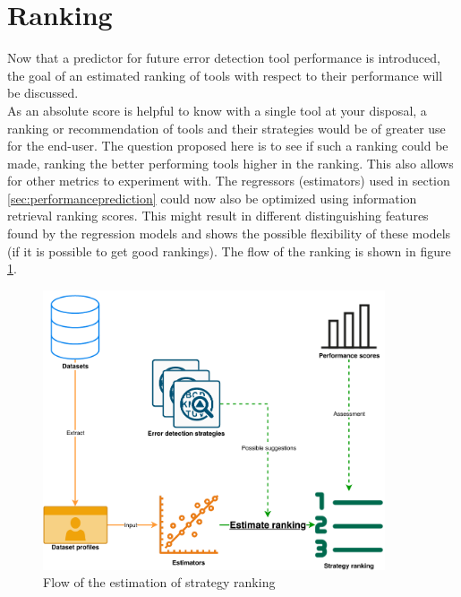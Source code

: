 \section{Ranking}
\label{sec:toolranking}
% 

Now that a predictor for future error detection tool performance is introduced, the goal of an estimated ranking of tools with respect to their performance will be discussed.
~\\As an absolute score is helpful to know with a single tool at your disposal, a ranking or recommendation of tools and their strategies would be of greater use for the end-user. The question proposed here is to see if such a ranking could be made, ranking the better performing tools higher in the ranking. This also allows for other metrics to experiment with. The regressors (estimators) used in section \ref{sec:performanceprediction} could now also be optimized using information retrieval ranking scores. This might result in different distinguishing features found by the regression models and shows the possible flexibility of these models (if it is possible to get good rankings).
The flow of the ranking is shown in figure \ref{fig:method_ranking}.

\begin{figure}
    \centering
    \includegraphics[width=0.9\textwidth]{thesis/Figures/Method/PerformanceEstimation-Ranking.pdf}
    \caption{Flow of the estimation of strategy ranking}
    \label{fig:method_ranking}
\end{figure}

